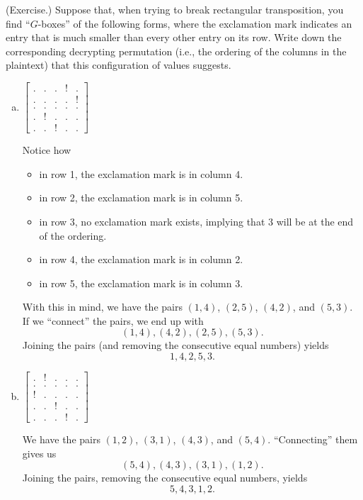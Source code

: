 \documentclass[letterpaper]{article}
\begin{document}
\begin{mdframed}
    (Exercise.) Suppose that, when trying to break rectangular transposition, you find ``$G$-boxes'' of the following forms, where the exclamation mark indicates an entry that is much smaller than every other entry on its row. Write down the corresponding decrypting permutation (i.e., the ordering of the columns in the plaintext) that this configuration of values suggests.

    \begin{enumerate}[(a)]
        \item $\begin{bmatrix}
            . & . & . & ! & . \\ 
            . & . & . & . & ! \\ 
            . & . & . & . & . \\ 
            . & ! & . & . & . \\ 
            . & . & ! & . & .
        \end{bmatrix}$
        \begin{mdframed}
            Notice how 
            \begin{itemize}
                \item in row 1, the exclamation mark is in column 4.
                \item in row 2, the exclamation mark is in column 5. 
                \item in row 3, no exclamation mark exists, implying that 3 will be at the end of the ordering. 
                \item in row 4, the exclamation mark is in column 2. 
                \item in row 5, the exclamation mark is in column 3. 
            \end{itemize}
            With this in mind, we have the pairs $(1, 4)$, $(2, 5)$, $(4, 2)$, and $(5, 3)$. If we ``connect'' the pairs, we end up with 
            \[(1, 4), (4, 2), (2, 5), (5, 3).\]
            Joining the pairs (and removing the consecutive equal numbers) yields 
            \[1, 4, 2, 5, 3.\]
        \end{mdframed}

        \item $\begin{bmatrix}
            . & ! & . & . & . \\ 
            . & . & . & . & . \\ 
            ! & . & . & . & . \\ 
            . & . & ! & . & . \\ 
            . & . & . & ! & . 
        \end{bmatrix}$
        \begin{mdframed}
            We have the pairs $(1, 2)$, $(3, 1)$, $(4, 3)$, and $(5, 4)$. ``Connecting'' them gives us 
            \[(5, 4), (4, 3), (3, 1), (1, 2).\]
            Joining the pairs, removing the consecutive equal numbers, yields 
            \[5, 4, 3, 1, 2.\]
        \end{mdframed}


\end{enumerate}
\end{mdframed}
\end{document}
